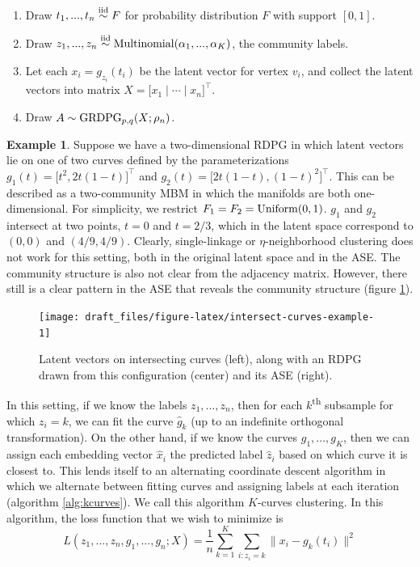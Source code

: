 \documentclass[
  12pt,
]{article}
\providecommand{\tightlist}{%
  \setlength{\itemsep}{0pt}\setlength{\parskip}{0pt}}
\theoremstyle{definition}
\theoremstyle{definition}
\newtheorem{example}{Example}[section]
\theoremstyle{definition}
\theoremstyle{definition}
\theoremstyle{remark}
\begin{document}
\begin{enumerate}
\def\labelenumi{\arabic{enumi}.}
\tightlist
\item
  Draw \(t_1, ..., t_n \stackrel{\mathrm{iid}}{\sim} F\) for probability distribution \(F\) with support \([0, 1]\).
\item
  Draw \(z_1, ..., z_n \stackrel{\mathrm{iid}}{\sim} \mathrm{Multinomial}(\alpha_1, ..., \alpha_K)\), the community labels.
\item
  Let each \(x_i = g_{z_i}(t_i)\) be the latent vector for vertex \(v_i\), and collect the latent vectors into matrix \(X = \Big[ x_1 \mid \cdots \mid x_n \Big]^\top\).
\item
  Draw \(A \sim \mathrm{GRDPG}_{p,q}(X; \rho_n)\).
\end{enumerate}

\begin{example}
\label{ex:intersect-curves}
Suppose we have a two-dimensional RDPG in which latent vectors lie on one of two curves defined by the parameterizations $g_1(t) = \Big[ t^2, 2 t (1-t) \Big]^\top$ and $g_2(t) = \Big[ 2 t (1-t), (1-t)^2 \Big]^\top$. 
This can be described as a two-community MBM in which the manifolds are both one-dimensional. 
For simplicity, we restrict $F_1 = F_2 = \mathrm{Uniform}(0, 1)$. 
$g_1$ and $g_2$ intersect at two points, $t = 0$ and $t = 2/3$, which in the latent space correspond to $(0, 0)$ and $(4/9, 4/9)$. 
Clearly, single-linkage or $\eta$-neighborhood clustering does not work for this setting, both in the original latent space and in the ASE. 
The community structure is also not clear from the adjacency matrix. 
However, there still is a clear pattern in the ASE that reveals the community structure (figure \ref{fig:intersect-curves-example}). 

\begin{figure}[H]

{\centering \texttt{[image: draft\_files/figure-latex/intersect-curves-example-1]} 

}

\caption{Latent vectors on intersecting curves (left), along with an RDPG drawn from this configuration (center) and its ASE (right).}\label{fig:intersect-curves-example}
\end{figure}
\end{example}

In this setting, if we know the labels \(z_1, ..., z_n\), then for each \(k\)\textsuperscript{th} subsample for which \(z_i = k\), we can fit the curve \(\hat{g}_k\) (up to an indefinite orthogonal transformation).
On the other hand, if we know the curves \(g_1, ..., g_K\), then we can assign each embedding vector \(\hat{x}_i\) the predicted label \(\hat{z}_i\) based on which curve it is closest to.
This lends itself to an alternating coordinate descent algorithm in which we alternate between fitting curves and assigning labels at each iteration (algorithm \ref{alg:kcurves}).
We call this algorithm \(K\)-curves clustering.
In this algorithm, the loss function that we wish to minimize is
\begin{equation}
\label{eq:kcurves-loss}
L(z_1, ..., z_n, g_1, ..., g_n; X) = \frac{1}{n} \sum_{k=1}^K \sum_{i: z_i = k} \|x_i - g_k(t_i)\|^2
\end{equation}
\end{document}

